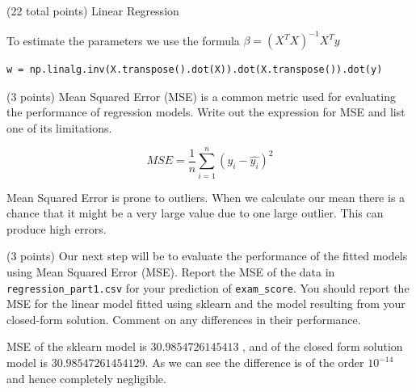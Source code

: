 \documentclass[12pt]{article}
\begin{document}
\begin{question}{(22 total points) Linear Regression}
\begin{subquestion}
\begin{answerbox}{20em}
To estimate the parameters we use the formula $\beta = (X^{T}X)^{-1}X^{T}y$
\begin{verbatim}
w = np.linalg.inv(X.transpose().dot(X)).dot(X.transpose()).dot(y)
\end{verbatim}
\end{answerbox}



\end{subquestion}



%
%
\begin{subquestion}{(3 points) Mean Squared Error (MSE) is a common metric used for evaluating the performance of regression models. 
Write out the expression for MSE and list one of its limitations. \\
}


\begin{answerbox}{10em}
$$MSE = \frac{1}{n}\sum_{i=1}^{n}(y_{i} - \hat{y_{i}})^2$$

Mean Squared Error is prone to outliers. When we calculate our mean there is a chance that it might be a very large value due to one large outlier. This can produce high errors.
\end{answerbox}



\end{subquestion}


 
%
%
\begin{subquestion}{(3 points) Our next step will be to evaluate the performance of the fitted models using Mean Squared Error (MSE). 
Report the MSE of the data in \texttt{regression\_part1.csv} for your prediction of \texttt{exam\_score}.
You should report the MSE for the linear model fitted using sklearn and the model resulting from your closed-form solution. 
Comment on any differences in their performance. 
}


\begin{answerbox}{10em}
MSE of the sklearn model is $30.9854726145413$ , and of the closed form solution model is $30.98547261454129$. As we can see the difference is of the order $10^{-14}$ and hence completely negligible.
\end{answerbox}




\end{subquestion}
\end{question}
\end{document}
